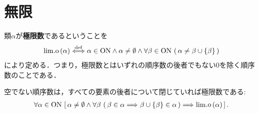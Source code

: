 \section{無限}
	\begin{screen}
		\begin{dfn}[極限数]
			類$\alpha$が{\bf 極限数}であるということを
			\begin{align}
				\mathrm{lim.o}\left(\alpha\right) \overset{\mathrm{def}}{\Longleftrightarrow} \alpha \in \mathrm{ON} \wedge \alpha \neq \emptyset
				\wedge \forall \beta \in \mathrm{ON}\, \left(\, \alpha \neq \beta \cup \{\beta\}\, \right)
			\end{align}
			により定める．つまり，極限数とはいずれの順序数の後者でもない$0$を除く順序数のことである．
		\end{dfn}
	\end{screen}
	
	\begin{screen}
		\begin{thm}[全ての要素の後者で閉じていれば極限数]\label{thm:if_closed_for_latter_then_limit_ordinal}
			空でない順序数は，すべての要素の後者について閉じていれば極限数である:
			\begin{align}
				\forall \alpha \in \mathrm{ON}\,
				\left[\, \alpha \neq \emptyset \wedge 
				\forall \beta\, \left(\, \beta \in \alpha \Longrightarrow \beta \cup \{\beta\} \in \alpha\, \right)
				\Longrightarrow \mathrm{lim.o}\left(\alpha\right)\, \right].
			\end{align}
		\end{thm}
	\end{screen}
	

